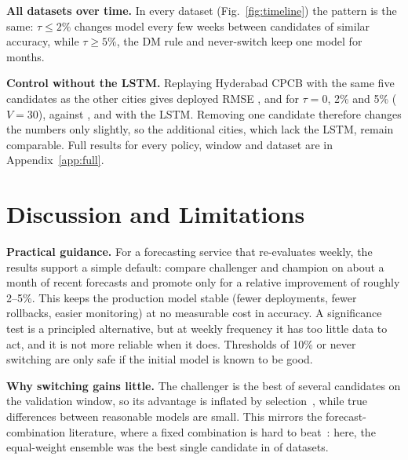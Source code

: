 \documentclass[conference]{IEEEtran}
\begin{document}


\textbf{All datasets over time.} In every dataset (Fig.~\ref{fig:timeline}) the pattern is the same: \(\tau\le2\%\) changes model every few weeks
between candidates of similar accuracy, while \(\tau\ge5\%\), the DM rule and never-switch keep one
model for months.

\textbf{Control without the LSTM.} Replaying Hyderabad CPCB with the same five candidates as the
other cities gives deployed RMSE ,
 and  for
\(\tau=0\), 2\% and 5\% (\(V=30\)), against ,
 and  with the LSTM. Removing one
candidate therefore changes the numbers only slightly, so the additional cities, which lack the
LSTM, remain comparable. Full results for every policy, window and dataset are in
Appendix~\ref{app:full}.
\fi

\section{Discussion and Limitations}

\textbf{Practical guidance.} For a forecasting service that re-evaluates weekly, the results support
a simple default: compare challenger and champion on about a month of recent forecasts and promote
only for a relative improvement of roughly 2--5\%. This keeps the production model stable
(fewer deployments, fewer rollbacks, easier monitoring) at no measurable cost in accuracy. A
significance test is a principled alternative, but at weekly frequency it has too little data to
act, and it is not more reliable when it does. Thresholds of 10\% or never switching are only safe
if the initial model is known to be good.

\textbf{Why switching gains little.} The challenger is the best of several candidates on the
validation window, so its advantage is inflated by selection~\cite{cawley2010}, while true
differences between reasonable models are small. This mirrors the forecast-combination
literature, where a fixed combination is hard to beat~\cite{timmermann2006}: here, the equal-weight
ensemble was the best single candidate in  of  datasets.
\end{document}
